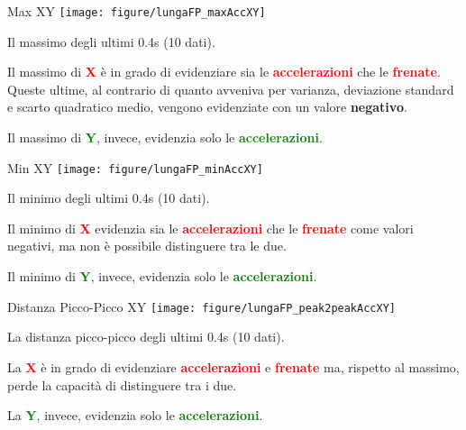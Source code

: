 \documentclass[a4paper, 9pt]{beamer}
\begin{document}
	\begin{frame}{{Max XY}}
		\centering\texttt{[image: figure/lungaFP\_maxAccXY]}	\vspace{.05\textheight}
		
		Il massimo degli ultimi 0.4s (10 dati).
		
		Il massimo di \textcolor{red}{\textbf{X}} è in grado di evidenziare sia le \textcolor{red}{\textbf{accelerazioni}} che le \textcolor{red}{\textbf{frenate}}. Queste ultime, al contrario di quanto avveniva per varianza, deviazione standard e scarto quadratico medio, vengono evidenziate con un valore \textbf{negativo}.
		
		Il massimo di \textcolor{green}{\textbf{Y}}, invece, evidenzia solo le \textcolor{green}{\textbf{accelerazioni}}.
		
	\end{frame}	
	
	\begin{frame}{{Min XY}}
		\centering\texttt{[image: figure/lungaFP\_minAccXY]}	\vspace{.05\textheight}
		
		Il minimo degli ultimi 0.4s (10 dati).
		
		Il minimo di \textcolor{red}{\textbf{X}} evidenzia sia le \textcolor{red}{\textbf{accelerazioni}} che le \textcolor{red}{\textbf{frenate}} come valori negativi, ma non è possibile distinguere tra le due.
		
		Il minimo di \textcolor{green}{\textbf{Y}}, invece, evidenzia solo le \textcolor{green}{\textbf{accelerazioni}}.
		
	\end{frame}
	
	\begin{frame}{{Distanza Picco-Picco XY}}
		\centering\texttt{[image: figure/lungaFP\_peak2peakAccXY]}	\vspace{.05\textheight}
		
		La distanza picco-picco degli ultimi 0.4s (10 dati).
		
		La \textcolor{red}{\textbf{X}} è in grado di evidenziare \textcolor{red}{\textbf{accelerazioni}} e \textcolor{red}{\textbf{frenate}} ma, rispetto al massimo, perde la capacità di distinguere tra i due.
		
		La \textcolor{green}{\textbf{Y}}, invece, evidenzia solo le \textcolor{green}{\textbf{accelerazioni}}.
		
	\end{frame}	
	
	
\end{document}
